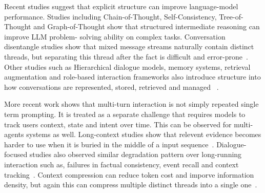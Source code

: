 \documentclass[pdflatex,sn-mathphys-num]{sn-jnl}%
\theoremstyle{thmstyleone}%
\theoremstyle{thmstyletwo}%
\theoremstyle{thmstylethree}%
\begin{document}
Recent studies suggest that explicit structure can improve language-model performance. Studies including  Chain-of-Thought, Self-Consistency, Tree-of-
Thought and Graph-of-Thought show that structured intermediate reasoning can improve LLM problem- solving ability on complex tasks. Conversation disentangle studies show that mixed message streams naturally contain distinct threads, but separating this thread after the fact is difficult and error-prone~\cite{elsner2008talking,jiang2018disentangle,kummerfeld2019disentanglement}. Other studies such as Hierarchical dialogue models, memory systems, retrieval augmentation and role-based interaction frameworks also introduce structure into how conversations are represented, stored, retrieved and managed ~\cite{serban2016hred,packer2023memgpt,wu2024stateful,lewis2020rag,li2023camel}.

















More recent work shows that multi-turn interaction is not simply repeated single term prompting. It is treated as a separate challenge that requires models to track users context, state and intent over time. This can be observed for multi-agents systems as well. Long-context studies show that relevent evidence becomes harder to use when it is buried in the middle of a input sequence~\cite{liu2023lostinthemiddle}. Dialogue-focused studies also observed similar degradation pattern over long-running interaction such as, failures in factual consistency, event recall and context tracking~\cite{laban2024limt,maharana2024locomo,xu2022goldfish,xu2022longpersona}. Context compression can reduce token cost and imporve information density, but again this can compress multiple distinct threads into a single one~\cite{jiang2024longllmlingua}.
\end{document}
